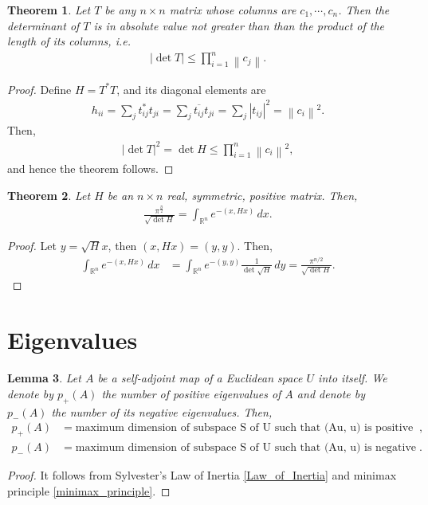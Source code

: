 \documentclass[10pt]{book}
\newtheorem{theorem}{Theorem}[chapter]
\newtheorem{lemma}[theorem]{Lemma}
\theoremstyle{definition}
\numberwithin{equation}{chapter}
\begin{document}
\medskip

\begin{theorem}
Let $T$ be any $n \times n$ matrix whose columns are $c_1, \cdots, c_n$. Then the determinant of $T$ is in absolute value not greater than than the product of the length of its columns, i.e.
\begin{align*}
    \left|\det T \right| \leq \prod^n_{i=1} \left\|c_j \right\|.
\end{align*}
\end{theorem}
\begin{proof}
Define $H = T^*T$, and its diagonal elements are
\begin{align*}
    h_{ii} = \sum_j t^*_{ij}t_{ji} = \sum_j \overline{t_{ij}} t_{ji} = \sum_j \left|t_{ij}\right|^2 = \left\|c_i \right\|^2.
\end{align*}
Then,
\begin{align*}
    \left|\det T \right|^2 = \det H \leq \prod^n_{i=1} \left\|c_i \right\|^2,
\end{align*}
and hence the theorem follows.
\end{proof}

\medskip

\begin{theorem}
Let $H$ be an $n \times n$ real, symmetric, positive matrix. Then,
\begin{align*}
    \frac{\pi^{\frac{n}{2}}}{\sqrt{\det H}} = \int_{\mathbb{R}^n} e^{-(x,Hx)}\, dx.
\end{align*}
\end{theorem}
\begin{proof}
Let $y = \sqrt{H}x$, then $(x, Hx) = (y, y)$. Then,
\begin{align*}
    \int_{\mathbb{R}^n} e^{-(x,Hx)}\, dx & = \int_{\mathbb{R}^n} e^{-(y,y)} \frac{1}{\det \sqrt{H}} \, dy = \frac{\pi^{n/2}}{\sqrt{\det H}}.
\end{align*}
\end{proof}

\section{Eigenvalues}
\begin{lemma}
Let $A$ be a self-adjoint map of a Euclidean space $U$ into itself. We denote by $p_+(A)$ the number of positive eigenvalues of $A$ and denote by $p_-(A)$ the number of its negative eigenvalues. Then, 
\begin{align*}
    p_+(A) & = \text{maximum dimension of subspace S of U such that (Au, u) is positive on S}, \\
    p_-(A) & = \text{maximum dimension of subspace S of U such that (Au, u) is negative on S}.
\end{align*}
\end{lemma}
\begin{proof}
It follows from Sylvester’s Law of Inertia \ref{Law_of_Inertia} and minimax principle \ref{minimax_principle}.
\end{proof}
\end{document}
